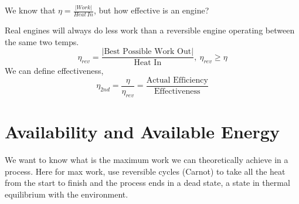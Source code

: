 \documentclass[a4paper, 11pt, normalem]{report}
\begin{document}
We know that $\eta = \frac{|Work|}{Heat\,In}$, but how effective is an engine?

Real engines will always do less work than a reversible engine operating between the same two temps.
\begin{equation*}
    \eta_{rev} = \frac{|\text{Best Possible Work Out}|}{\text{Heat In}},~ \eta_{rev} \geq \eta
\end{equation*}
We can define effectiveness,
\begin{equation*}
    \eta_{2nd} = \frac{\eta}{\eta_{rev}} = \frac{\text{Actual Efficiency}}{\text{Effectiveness}}
\end{equation*}

\section{Availability and Available Energy}
We want to know what is the maximum work we can theoretically achieve in a process.
Here for max work, use reversible cycles (Carnot) to take all the heat from the start to finish and the process ends in a dead state, a state in thermal equilibrium with the environment.
\end{document}
